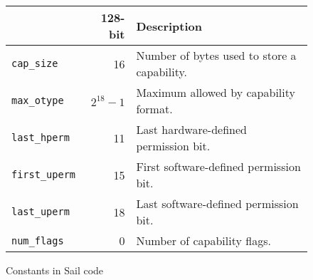 \begin{figure}
\begin{center}
\begin{tabular}{lrl}
\toprule
 & 128-bit & Description \\
\midrule
\verb+cap_size+ & 16 & Number of bytes used to store a capability. \\
\verb+max_otype+ & $2^{18}-1$ & Maximum \cotype{} allowed by capability format. \\
\verb+last_hperm+ & 11 & Last hardware-defined permission bit. \\
\verb+first_uperm+ & 15 & First software-defined permission bit. \\
\verb+last_uperm+ & 18 & Last software-defined permission bit. \\
\verb+num_flags+ & 0 & Number of capability flags. \\
\bottomrule
\end{tabular}
\end{center}

\caption{Constants in Sail code}
\label{table:pseudocode-constants}
\end{figure}

%
%

%
%
%

